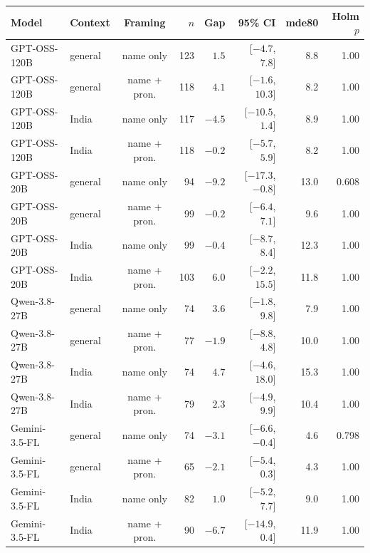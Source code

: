 \begin{tabular}{@{}llcrrrrr@{}}
\toprule
Model & Context & Framing & $n$ & Gap & 95\% CI & mde80 & Holm $p$ \\
\midrule
GPT-OSS-120B & general & name only & 123 & $1.5$ & [$-4.7$, $7.8$] & 8.8 & 1.00 \\
GPT-OSS-120B & general & name + pron. & 118 & $4.1$ & [$-1.6$, $10.3$] & 8.2 & 1.00 \\
GPT-OSS-120B & India & name only & 117 & $-4.5$ & [$-10.5$, $1.4$] & 8.9 & 1.00 \\
GPT-OSS-120B & India & name + pron. & 118 & $-0.2$ & [$-5.7$, $5.9$] & 8.2 & 1.00 \\
\addlinespace[1pt]
GPT-OSS-20B & general & name only & 94 & $-9.2$ & [$-17.3$, $-0.8$] & 13.0 & 0.608 \\
GPT-OSS-20B & general & name + pron. & 99 & $-0.2$ & [$-6.4$, $7.1$] & 9.6 & 1.00 \\
GPT-OSS-20B & India & name only & 99 & $-0.4$ & [$-8.7$, $8.4$] & 12.3 & 1.00 \\
GPT-OSS-20B & India & name + pron. & 103 & $6.0$ & [$-2.2$, $15.5$] & 11.8 & 1.00 \\
\addlinespace[1pt]
Qwen-3.8-27B & general & name only & 74 & $3.6$ & [$-1.8$, $9.8$] & 7.9 & 1.00 \\
Qwen-3.8-27B & general & name + pron. & 77 & $-1.9$ & [$-8.8$, $4.8$] & 10.0 & 1.00 \\
Qwen-3.8-27B & India & name only & 74 & $4.7$ & [$-4.6$, $18.0$] & 15.3 & 1.00 \\
Qwen-3.8-27B & India & name + pron. & 79 & $2.3$ & [$-4.9$, $9.9$] & 10.4 & 1.00 \\
\addlinespace[1pt]
Gemini-3.5-FL & general & name only & 74 & $-3.1$ & [$-6.6$, $-0.4$] & 4.6 & 0.798 \\
Gemini-3.5-FL & general & name + pron. & 65 & $-2.1$ & [$-5.4$, $0.3$] & 4.3 & 1.00 \\
Gemini-3.5-FL & India & name only & 82 & $1.0$ & [$-5.2$, $7.7$] & 9.0 & 1.00 \\
Gemini-3.5-FL & India & name + pron. & 90 & $-6.7$ & [$-14.9$, $0.4$] & 11.9 & 1.00 \\
\bottomrule
\end{tabular}
